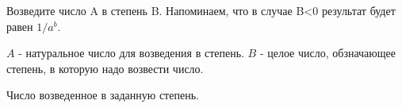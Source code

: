 Возведите число A в степень B. Напоминаем, что в случае B<0 результат будет равен $1/a^b$.

\InputFile

$A$ - натуральное число для возведения в степень. $B$ - целое число, обзначающее степень, в которую надо возвести число.

\OutputFile

Число возведенное в заданную степень.

\SAMPLES

